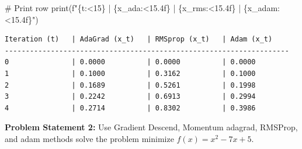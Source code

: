 \documentclass[
  letterpaper,
  DIV=11,
  numbers=noendperiod]{scrreprt}
\newenvironment{Shaded}{\begin{snugshade}}{\end{snugshade}}
\newcommand{\BuiltInTok}[1]{\textcolor[rgb]{0.00,0.23,0.31}{#1}}
\newcommand{\CommentTok}[1]{\textcolor[rgb]{0.37,0.37,0.37}{#1}}
\newcommand{\NormalTok}[1]{\textcolor[rgb]{0.00,0.23,0.31}{#1}}
\newcommand{\SpecialCharTok}[1]{\textcolor[rgb]{0.37,0.37,0.37}{#1}}
\newcommand{\SpecialStringTok}[1]{\textcolor[rgb]{0.13,0.47,0.30}{#1}}
\begin{document}
\begin{Shaded}
\begin{Highlighting}[]
    \CommentTok{\# Print row}
    \BuiltInTok{print}\NormalTok{(}\SpecialStringTok{f"}\SpecialCharTok{\{}\NormalTok{t}\SpecialCharTok{:\textless{}15\}}\SpecialStringTok{ | }\SpecialCharTok{\{}\NormalTok{x\_ada}\SpecialCharTok{:\textless{}15.4f\}}\SpecialStringTok{ | }\SpecialCharTok{\{}\NormalTok{x\_rms}\SpecialCharTok{:\textless{}15.4f\}}\SpecialStringTok{ | }\SpecialCharTok{\{}\NormalTok{x\_adam}\SpecialCharTok{:\textless{}15.4f\}}\SpecialStringTok{"}\NormalTok{)}
\end{Highlighting}
\end{Shaded}

\begin{verbatim}
Iteration (t)   | AdaGrad (x_t)   | RMSprop (x_t)   | Adam (x_t)     
--------------------------------------------------------------------
0               | 0.0000          | 0.0000          | 0.0000         
1               | 0.1000          | 0.3162          | 0.1000         
2               | 0.1689          | 0.5261          | 0.1998         
3               | 0.2242          | 0.6913          | 0.2994         
4               | 0.2714          | 0.8302          | 0.3986         
\end{verbatim}

\textbf{Problem Statement 2:} Use Gradient Descend, Momentum adagrad,
RMSProp, and adam methods solve the problem minimize \(f(x)=x^2-7x+5\).
\end{document}
